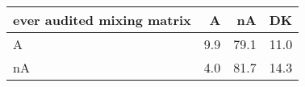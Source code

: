 \begin{table}[ht]
\centering
\begin{tabular}{lrrr}
  \hline
ever audited mixing matrix & A & nA & DK \\ 
  \hline
A & 9.9 & 79.1 & 11.0 \\ 
  nA & 4.0 & 81.7 & 14.3 \\ 
   \hline
\end{tabular}
\end{table}
